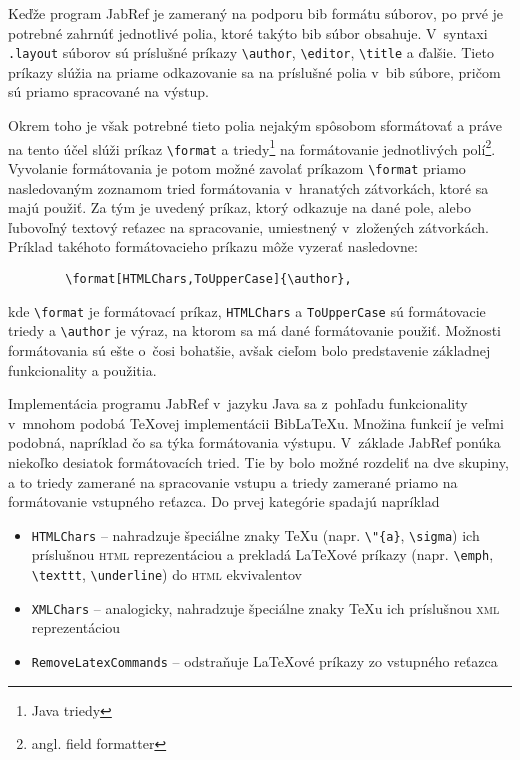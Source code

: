 \documentclass{fithesis3}
\begin{document}
	Keďže program JabRef je zameraný na podporu bib formátu súborov, po prvé je potrebné zahrnúť jednotlivé polia, ktoré takýto bib súbor obsahuje. V~syntaxi \texttt{.layout} súborov sú príslušné príkazy \verb|\author|, \verb|\editor|, \verb|\title| a ďalšie. Tieto príkazy slúžia na priame odkazovanie sa na príslušné polia v~bib súbore, pričom sú priamo spracované na výstup.
	
	Okrem toho je však potrebné tieto polia nejakým spôsobom sformátovať a práve na tento účel slúži príkaz \verb|\format| a triedy\footnote{Java triedy} na formátovanie jednotlivých polí\footnote{angl. field formatter}. Vyvolanie formátovania je potom možné zavolať príkazom \verb|\format| priamo nasledovaným zoznamom tried formátovania v~hranatých zátvorkách, ktoré sa majú použiť. Za tým je uvedený príkaz, ktorý odkazuje na dané pole, alebo ľubovoľný textový reťazec na spracovanie, umiestnený v~zložených zátvorkách. Príklad takéhoto formátovacieho príkazu môže vyzerať nasledovne:

	\begin{verbatim}
		\format[HTMLChars,ToUpperCase]{\author},
	\end{verbatim}
	
	\noindent kde \verb|\format| je formátovací príkaz, \texttt{HTMLChars} a \texttt{ToUpperCase} sú formátovacie triedy a \verb|\author| je výraz, na ktorom sa má dané formátovanie použiť. Možnosti formátovania sú ešte o~čosi bohatšie, avšak cieľom bolo predstavenie základnej funkcionality a použitia.
	
	
	Implementácia programu JabRef v~jazyku Java sa z~pohľadu funkcionality v~mnohom podobá \TeX ovej implementácii BibLaTeXu. Množina funkcií je veľmi podobná, napríklad čo sa týka formátovania výstupu. V~základe JabRef ponúka niekoľko desiatok formátovacích tried. Tie by bolo možné rozdeliť na dve skupiny, a to triedy zamerané na spracovanie vstupu a triedy zamerané priamo na formátovanie vstupného reťazca. Do prvej kategórie spadajú napríklad
	
	\begin{itemize}
	\item \texttt{HTMLChars} -- nahradzuje špeciálne znaky \TeX u (napr. \verb|\"{a}|, \verb|\sigma|) ich príslušnou \textsc{html} reprezentáciou a prekladá \LaTeX ové príkazy (napr. \verb|\emph|, \verb|\texttt|, \verb|\underline|) do \textsc{html} ekvivalentov
	\item \texttt{XMLChars} -- analogicky, nahradzuje špeciálne znaky \TeX u ich príslušnou \textsc{xml} reprezentáciou
	\item \texttt{RemoveLatexCommands} -- odstraňuje \LaTeX ové príkazy zo vstupného reťazca
	\end{itemize}
	
\end{document}

